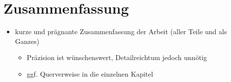 \chapter{Zusammenfassung}

\begin{itemize}
	\item kurze und prägnante Zusammenfassung der Arbeit (aller Teile und als Ganzes)
	\begin{itemize}
		\item Präzision ist wünschenswert, Detailreichtum jedoch unnötig
		\item ggf. Querverweise in die einzelnen Kapitel
	\end{itemize}
\end{itemize}
